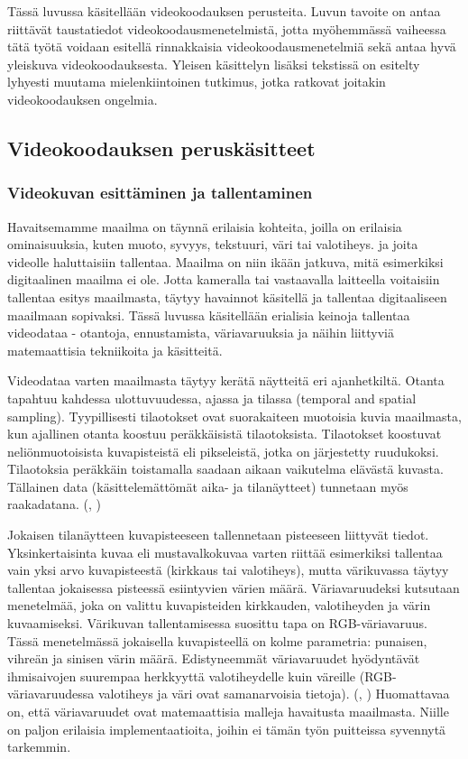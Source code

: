 Tässä luvussa käsitellään videokoodauksen perusteita. Luvun tavoite on
antaa riittävät taustatiedot videokoodausmenetelmistä, jotta myöhemmässä
vaiheessa tätä työtä voidaan esitellä rinnakkaisia
videokoodausmenetelmiä sekä antaa hyvä yleiskuva videokoodauksesta. Yleisen
käsittelyn lisäksi tekstissä on esitelty lyhyesti muutama mielenkiintoinen
tutkimus, jotka ratkovat joitakin videokoodauksen ongelmia.

\subsection{Videokoodauksen peruskäsitteet}

\subsubsection{Videokuvan esittäminen ja tallentaminen}

Havaitsemamme maailma on täynnä erilaisia kohteita, joilla on
erilaisia ominaisuuksia, kuten muoto, syvyys, tekstuuri, väri tai valotiheys.
ja joita videolle haluttaisiin tallentaa. Maailma on niin ikään jatkuva,
mitä esimerkiksi digitaalinen maailma ei ole. Jotta kameralla tai vastaavalla
laitteella voitaisiin tallentaa esitys maailmasta, täytyy havainnot käsitellä ja
tallentaa digitaaliseen maailmaan sopivaksi. Tässä luvussa käsitellään
erialisia keinoja tallentaa videodataa - otantoja, ennustamista, väriavaruuksia
ja näihin liittyviä matemaattisia tekniikoita ja käsitteitä.

Videodataa varten maailmasta täytyy kerätä näytteitä eri ajanhetkiltä. Otanta
tapahtuu kahdessa ulottuvuudessa, ajassa ja tilassa (temporal and spatial
sampling). Tyypillisesti tilaotokset ovat suorakaiteen muotoisia kuvia
maailmasta, kun ajallinen otanta koostuu peräkkäisistä tilaotoksista.
Tilaotokset koostuvat neliönmuotoisista kuvapisteistä eli pikseleistä, jotka
on järjestetty ruudukoksi. Tilaotoksia peräkkäin toistamalla saadaan aikaan
vaikutelma elävästä kuvasta. Tällainen data (käsittelemättömät aika- ja
tilanäytteet) tunnetaan myös raakadatana. (\citealt{h264}, \citealt{du})

Jokaisen tilanäytteen kuvapisteeseen tallennetaan pisteeseen liittyvät
tiedot. Yksinkertaisinta kuvaa eli mustavalkokuvaa varten riittää esimerkiksi
tallentaa vain yksi arvo kuvapisteestä (kirkkaus tai valotiheys), mutta
värikuvassa täytyy tallentaa jokaisessa pisteessä esiintyvien värien määrä.
Väriavaruudeksi kutsutaan menetelmää, joka on valittu kuvapisteiden kirkkauden,
valotiheyden ja värin kuvaamiseksi. Värikuvan tallentamisessa suosittu tapa on
RGB-väriavaruus. Tässä menetelmässä jokaisella kuvapisteellä on
kolme parametria: punaisen, vihreän ja sinisen värin määrä. Edistyneemmät
väriavaruudet hyödyntävät ihmisaivojen suurempaa herkkyyttä valotiheydelle
kuin väreille (RGB-väriavaruudessa valotiheys ja väri ovat samanarvoisia
tietoja). (\citealt{h264}, \citealt{du}) Huomattavaa on, että väriavaruudet ovat matemaattisia
malleja havaitusta maailmasta. Niille on paljon erilaisia implementaatioita,
joihin ei tämän työn puitteissa syvennytä tarkemmin.

